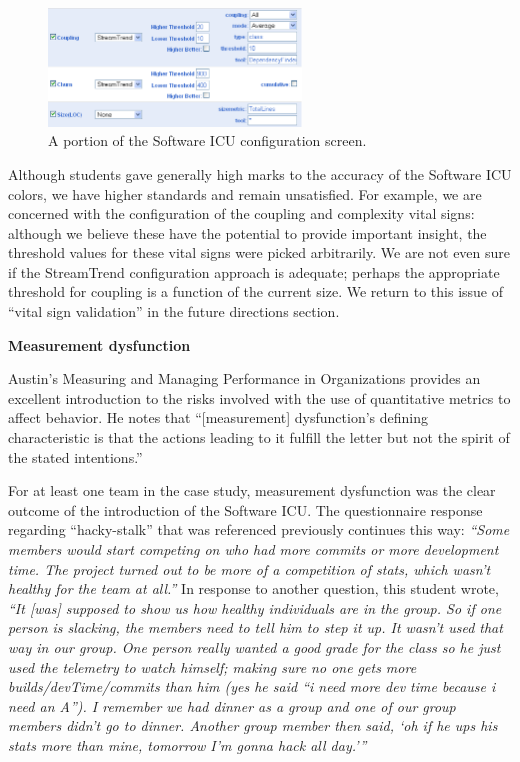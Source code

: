 \documentclass{acm_proc_article-sp}
\begin{document}
\begin{figure}[ht]
  \center
  \includegraphics[width=0.6\textwidth]{configuration.eps}
  \caption{A portion of the Software ICU configuration screen.}
  \label{fig:configuration}
\end{figure} 

Although students gave generally high marks to the accuracy of the Software
ICU colors, we have higher standards and remain unsatisfied.  For example,
we are concerned with the configuration of the coupling and complexity
vital signs: although we believe these have the potential to provide
important insight, the threshold values for these vital signs were picked
arbitrarily.  We are not even sure if the StreamTrend configuration
approach is adequate; perhaps the appropriate threshold for coupling is a
function of the current size. We return to this issue of ``vital sign validation'' in the
future directions section.

{\bf Measurement dysfunction}

Austin's Measuring and Managing Performance in Organizations
\cite{Austin96} provides an excellent introduction to the risks involved
with the use of quantitative metrics to affect behavior.  He notes that
``[measurement] dysfunction's defining characteristic is that the actions
leading to it fulfill the letter but not the spirit of the stated
intentions.''

For at least one team in the case study, measurement dysfunction was the
clear outcome of the introduction of the Software ICU.  The questionnaire response
regarding ``hacky-stalk'' that was referenced previously continues this way:
{\em ``Some members would
start competing on who had more commits or more development time.  The
project turned out to be more of a competition of stats, which wasn't
healthy for the team at all.''}  In response to another question, this student wrote, 
{\em ``It [was] supposed to show us how healthy
individuals are in the group. So if one person is slacking, the members
need to tell him to step it up.  It wasn't used that way in our group.  One
person really wanted a good grade for the class so he just used the
telemetry to watch himself; making sure no one gets more
builds/devTime/commits than him (yes he said ``i need more dev time because
i need an A'').  I remember we had dinner as a group and one of our group
members didn't go to dinner.  Another group member then said, `oh if he ups
his stats more than mine, tomorrow I'm gonna hack all day.'''}
\end{document}
